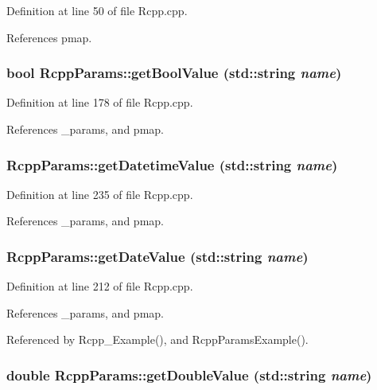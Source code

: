 Definition at line 50 of file Rcpp.cpp.

References pmap.\hypertarget{classRcppParams_ad818a50a0e269360f3f74c5259dec882}{
\subsubsection[{getBoolValue}]{\setlength{\rightskip}{0pt plus 5cm}bool RcppParams::getBoolValue (std::string {\em name})}}
\label{classRcppParams_ad818a50a0e269360f3f74c5259dec882}


Definition at line 178 of file Rcpp.cpp.

References \_\-params, and pmap.\hypertarget{classRcppParams_aa4bec8bfe32d5079e64dc1c9a8fcf1b9}{
\subsubsection[{getDatetimeValue}]{ RcppParams::getDatetimeValue (std::string {\em name})}}
\label{classRcppParams_aa4bec8bfe32d5079e64dc1c9a8fcf1b9}


Definition at line 235 of file Rcpp.cpp.

References \_\-params, and pmap.\hypertarget{classRcppParams_aae20c7ee73aa2f1176837cc9387ad008}{
\subsubsection[{getDateValue}]{ RcppParams::getDateValue (std::string {\em name})}}
\label{classRcppParams_aae20c7ee73aa2f1176837cc9387ad008}


Definition at line 212 of file Rcpp.cpp.

References \_\-params, and pmap.

Referenced by Rcpp\_\-Example(), and RcppParamsExample().\hypertarget{classRcppParams_aa45f8bc1cd8a64aa9a98e24158407077}{
\subsubsection[{getDoubleValue}]{\setlength{\rightskip}{0pt plus 5cm}double RcppParams::getDoubleValue (std::string {\em name})}}
\label{classRcppParams_aa45f8bc1cd8a64aa9a98e24158407077}


